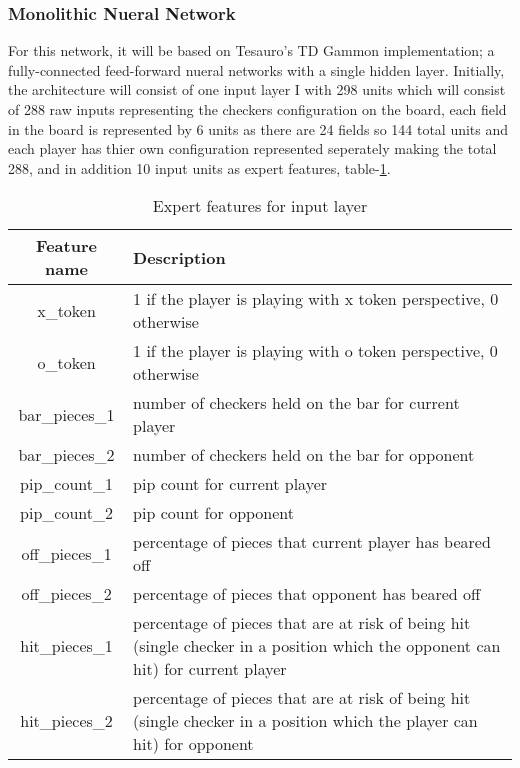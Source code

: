\documentclass[12pt,a4paper]{article}
\begin{document}
\subsubsection{Monolithic Nueral Network}
For this network, it will be based on Tesauro's TD Gammon implementation; a fully-connected feed-forward nueral networks with a single hidden layer. Initially, the architecture will consist of one input layer I with 298 units which will consist of 288 raw inputs representing the checkers configuration on the board, each field in the board is represented by 6 units as there are 24 fields so 144 total units and each player has thier own configuration represented seperately making the total 288, and in addition 10 input units as expert features, table-\ref{exfeat}.
\begin{table}[htb]
    \centering
    \caption{Expert features for input layer}
    \vspace*{6pt}
    \label{exfeat}
    \begin{tabular}{cp{12cm}}
        \hline
        \hline
        Feature name & Description \\ 
        \hline
        x\_token & 1 if the player is playing with x token perspective, 0 otherwise \\
        \hline
        o\_token & 1 if the player is playing with o token perspective, 0 otherwise \\
        \hline
        bar\_pieces\_1 & number of checkers held on the bar for current player\\
        \hline
        bar\_pieces\_2 & number of checkers held on the bar for opponent\\
        \hline
        pip\_count\_1 & pip count for current player \\
        \hline
        pip\_count\_2 & pip count for opponent \\
        \hline
        off\_pieces\_1 & percentage of pieces that current player has beared off \\
        \hline
        off\_pieces\_2 & percentage of pieces that opponent has beared off \\
        \hline
        hit\_pieces\_1 & percentage of pieces that are at risk of being hit (single checker in a position which the opponent can hit) for current player \\
        \hline
        hit\_pieces\_2 & percentage of pieces that are at risk of being hit (single checker in a position which the player can hit) for opponent\\
        \hline
    \end{tabular}
\end{table}
\end{document}
